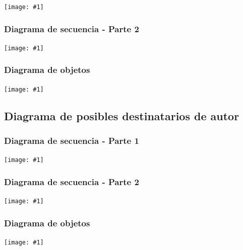 \documentclass[a4paper, 10pt, twoside]{article}
\newcommand{\grafico}[1]{
  \begin{center}
    \texttt{[image: \#1]}
  \end{center}
}
\begin{document}
\grafico{diagramas/secuenciaEnvioDeMensajes1.pdf}

\subsubsection{Diagrama de secuencia - Parte 2}
\label{sec-envio2}

\grafico{diagramas/secuenciaEnvioDeMensajes2.pdf}

\subsubsection{Diagrama de objetos}
\label{obj-envio}

\grafico{diagramas/objetosMensaje.pdf}

\subsection{Diagrama de posibles destinatarios de autor}

\subsubsection{Diagrama de secuencia - Parte 1}
\label{sec-destinatarios1}
\grafico{diagramas/secuenciaPosiblesDestinatarios1.pdf}

\subsubsection{Diagrama de secuencia - Parte 2}
\label{sec-destinatarios2}
\grafico{diagramas/secuenciaPosiblesDestinatarios2.pdf}

\subsubsection{Diagrama de objetos}
\label{obj-destinatarios}
\grafico{diagramas/objetosPosiblesDestinatarios.pdf}
\end{document}
